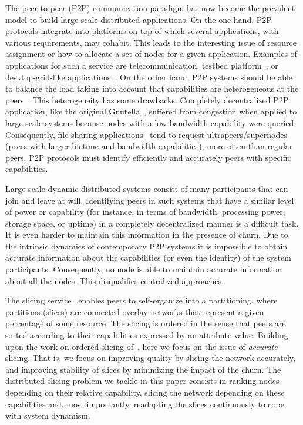 \documentclass[times,10pt,twocolumn]{article}
\begin{document}


The peer to peer (P2P) communication paradigm has now become the prevalent
model to build large-scale distributed applications.
On the one hand, P2P protocols integrate into
platforms on top of which several applications, with various requirements,
may cohabit. 
This leads to the interesting issue of resource 
assignment or how to allocate a set of nodes for a given application. 
Examples of applications for such a service are telecommunication,
testbed platform~\cite{BBC+04}, 
or desktop-grid-like applications~\cite{A04}.
On the other hand, P2P systems should be able to balance the 
load taking into account that capabilities are heterogeneous 
at the peers~\cite{SGG02,BSV03,SR06}.
This heterogeneity has some drawbacks.
Completely decentralized P2P
application, like the original Gnutella~\cite{gnutella}, suffered from congestion when 
applied to large-scale systems because nodes with a low bandwidth 
capability were queried.
Consequently, file sharing applications~\cite{kazaa,gpd} tend
to request ultrapeers/supernodes (peers with larger lifetime and 
bandwidth capabilities), more often than regular peers.  
P2P protocols must identify efficiently and accurately peers
with specific capabilities.



Large scale dynamic distributed systems consist of many 
participants that can join and leave 
at will. Identifying peers in such systems that have a similar level
 of power or capability (for instance, in terms of bandwidth, 
processing power, storage space, or uptime) in a completely 
decentralized manner is a difficult task. It is even harder 
to maintain this information in the presence of churn. 
 Due to the intrinsic dynamics of contemporary P2P
 systems it is impossible to obtain accurate information about 
the capabilities (or even the identity) of the system participants. 
Consequently, no node is able to maintain accurate information about 
all the nodes. This  disqualifies  centralized approaches.  

The slicing service~\cite{JK06} enables peers 
to self-organize into a partitioning,
where partitions (slices) are connected overlay networks that represent
a given percentage of some resource.
The slicing is ordered in the sense that peers are sorted
according to their capabilities expressed by an attribute value.
Building upon the work on ordered slicing
of~\cite{JK06}, here we focus on the issue of 
\textit{accurate} slicing. 
That is, we focus on improving quality by slicing the network accurately,
and improving stability of slices by minimizing the impact of the churn.
The distributed slicing problem we tackle in this paper consists in 
ranking nodes depending on their relative capability, slicing the network 
depending on these capabilities and, most importantly, readapting
the slices continuously to cope with system dynamism.  
\end{document}
